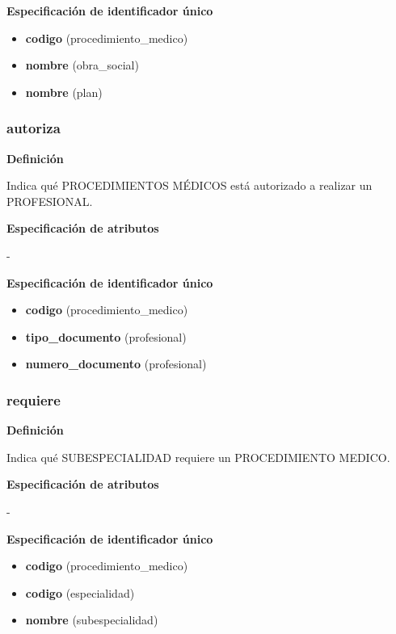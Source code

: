 \documentclass[a4paper,11pt]{article}
\begin{document}
\textbf{Especificación de identificador único}

\begin{itemize}

     \item \textbf{codigo} (procedimiento\_medico)

     \item \textbf{nombre} (obra\_social)

     \item \textbf{nombre} (plan)

\end{itemize}

\subsubsection{\textbf{autoriza}}

\textbf{Definición}

Indica qué PROCEDIMIENTOS MÉDICOS está autorizado a realizar un PROFESIONAL.

\textbf{Especificación de atributos}

-

\textbf{Especificación de identificador único}

\begin{itemize}

     \item \textbf{codigo} (procedimiento\_medico)

     \item \textbf{tipo\_documento} (profesional)

     \item \textbf{numero\_documento} (profesional)

\end{itemize}

\subsubsection{\textbf{requiere}}

\textbf{Definición}

Indica qué SUBESPECIALIDAD requiere un PROCEDIMIENTO MEDICO.

\textbf{Especificación de atributos}

-

\textbf{Especificación de identificador único}

\begin{itemize}

     \item \textbf{codigo} (procedimiento\_medico)

     \item \textbf{codigo} (especialidad)

     \item \textbf{nombre} (subespecialidad)

\end{itemize}
\end{document}
